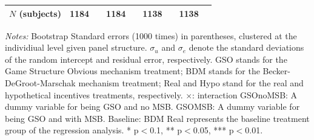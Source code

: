 \documentclass[12pt]{article}
\begin{document}
\begin{table}[H]
{\begin{tabular}{l*{4}{cc}}
\(N \) (subjects)      &        1184         &            &        1184         &            &        1138         &            &        1138         &            \\
\hline \hline
\end{tabular}
}




\begin{tablenotes}
          \footnotesize
           \item \textit{Notes:} Bootstrap Standard errors (1000 times) in parentheses, clustered at the individiual level given panel structure.  $\sigma_u$ and $\sigma_e$ denote the standard deviations of the random intercept and residual error, respectively. GSO stands for the Game Structure Obvious mechanism treatment; BDM stands for the Becker-DeGroot-Marschak mechanism treatment; Real and Hypo stand for the real and hypothetical incentives treatments, respectively. $\times$: interaction GSOnoMSB: A dummy variable for being GSO and no MSB. GSOMSB: A dummy variable for being GSO and with MSB.
             Baseline: BDM Real represents the baseline treatment group of the regression analysis. * p$<$0.1, ** p$<$0.05, *** p$<$0.01.
        \end{tablenotes}
            \end{table}

\clearpage
\end{document}
